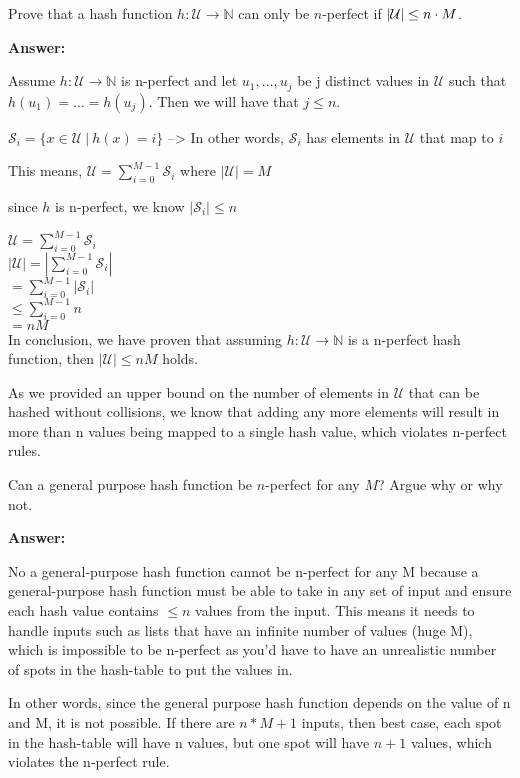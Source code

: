 \begin{problem}
\begin{questions}
\item Prove that a hash function $h : \mathcal{U} \rightarrow \mathbb{N}$ can only be $n$-perfect if $\lvert \mathcal{U} \rvert \leq n \cdot M$.

\textbf{Answer:}

Assume $h : \mathcal{U} \rightarrow \mathbb{N}$ is n-perfect and let 
$u_1, \dots, u_j$ be j distinct values in $\mathcal{U}$ such that $h(u_1) = \dots = h(u_j)$. Then we will have that $j \leq n$.

$\mathcal{S}_i = \{x \in \mathcal{U}\:|\:h(x) = i\}$ --> In other words, $\mathcal{S}_i$ has elements in $\mathcal{U}$ that map to $i$

This means, $\mathcal{U} = \sum_{i=0}^{M-1} \mathcal{S}_i$ where $|\mathcal{U}| = M$

since $h$ is n-perfect, we know $|\mathcal{S}_i| \leq n$

$\mathcal{U} = \sum_{i=0}^{M-1} \mathcal{S}_i$\\
$|\mathcal{U}| = |\sum_{i=0}^{M-1} \mathcal{S}_i|$\\
$ = \sum_{i=0}^{M-1} |\mathcal{S}_i|$\\
$ \leq \sum_{i=0}^{M-1} n$\\
$ = nM $\\

In conclusion, we have proven that assuming $h : \mathcal{U} \rightarrow \mathbb{N}$ is a n-perfect hash function, then $|\mathcal{U}| \leq nM$ holds.

As we provided an upper bound on the number of elements in $\mathcal{U}$ that can be hashed without collisions, we know that adding any more elements will result in more than n values being mapped to a single hash value, which violates n-perfect rules.

\item Can a general purpose hash function be $n$-perfect for any $M$? Argue why or why not.

\textbf{Answer: }

No a general-purpose hash function cannot be n-perfect for any M because a general-purpose hash function must be able to take in any set of input and ensure each hash value contains $\leq n$ values from the input. 
This means it needs to handle inputs such as lists that have an infinite number of values (huge M), which is impossible to be n-perfect as you'd have to have an unrealistic number of spots in the hash-table to put the values in. 

In other words, since the general purpose hash function depends on the value of n and M, it is not possible. If there are $n*M+1$ inputs, then best case, each spot in the hash-table will have n values, but one spot will have $n+1$ values, which violates the n-perfect rule.




\end{questions}
\end{problem}
